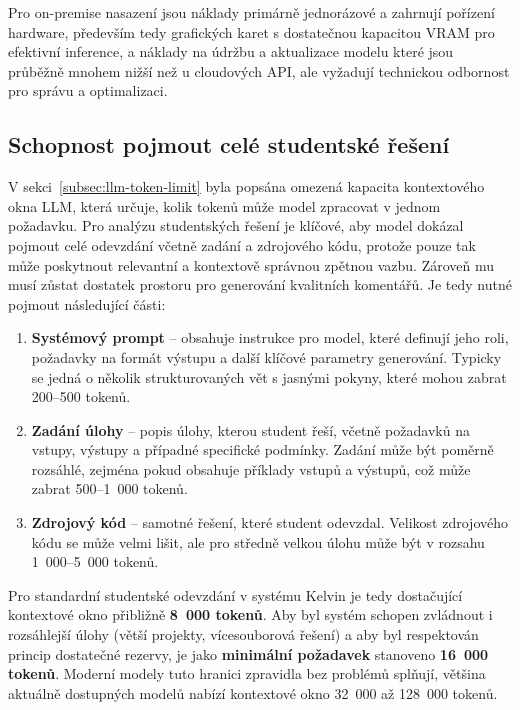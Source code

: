 Pro on-premise nasazení jsou náklady primárně jednorázové a zahrnují pořízení hardware, především tedy grafických karet s dostatečnou kapacitou VRAM pro efektivní inference, a náklady na údržbu a aktualizace modelu které jsou průběžně mnohem nižší než u cloudových API, ale vyžadují technickou odbornost pro správu a optimalizaci.

\subsection{Schopnost pojmout celé studentské řešení}
\label{subsec:criteria-context-window}

V sekci~\ref{subsec:llm-token-limit} byla popsána omezená kapacita kontextového okna LLM, která určuje, kolik tokenů může model zpracovat v jednom požadavku.
Pro analýzu studentských řešení je klíčové, aby model dokázal pojmout celé odevzdání včetně zadání a zdrojového kódu, protože pouze tak může poskytnout relevantní a kontextově správnou zpětnou vazbu.
Zároveň mu musí zůstat dostatek prostoru pro generování kvalitních komentářů.
Je tedy nutné pojmout následující části:

\begin{enumerate}
    \item \textbf{Systémový prompt} -- obsahuje instrukce pro model, které definují jeho roli, požadavky na formát výstupu a další klíčové parametry generování.
    Typicky se jedná o několik strukturovaných vět s jasnými pokyny, které mohou zabrat 200--500 tokenů.

    \item \textbf{Zadání úlohy} -- popis úlohy, kterou student řeší, včetně požadavků na vstupy, výstupy a případné specifické podmínky.
    Zadání může být poměrně rozsáhlé, zejména pokud obsahuje příklady vstupů a výstupů, což může zabrat 500--1~000 tokenů.

    \item \textbf{Zdrojový kód} -- samotné řešení, které student odevzdal.
    Velikost zdrojového kódu se může velmi lišit, ale pro středně velkou úlohu může být v rozsahu 1~000--5~000 tokenů.
\end{enumerate} 

Pro standardní studentské odevzdání v systému Kelvin je tedy dostačující kontextové okno přibližně \textbf{8~000 tokenů}.
Aby byl systém schopen zvládnout i rozsáhlejší úlohy (větší projekty, vícesouborová řešení) a aby byl respektován princip dostatečné rezervy, je jako \textbf{minimální požadavek} stanoveno \textbf{16~000 tokenů}.
Moderní modely tuto hranici zpravidla bez problémů splňují, většina aktuálně dostupných modelů nabízí kontextové okno 32~000 až 128~000 tokenů.

